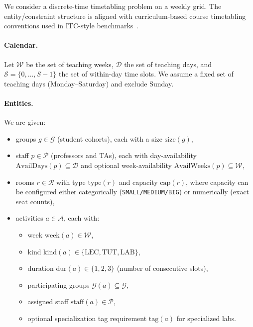 We consider a discrete-time timetabling problem on a weekly grid.
The entity/constraint structure is aligned with curriculum-based course timetabling conventions used in ITC-style benchmarks~\cite{bonutti2012benchmarking,bettinelli2015overview}.

\paragraph{Calendar.}
Let $\mathcal{W}$ be the set of teaching weeks, $\mathcal{D}$ the set of teaching days, and $\mathcal{S}=\{0,\dots,S-1\}$ the set of within-day time slots.
We assume a fixed set of teaching days (Monday--Saturday) and exclude Sunday.

\paragraph{Entities.}
We are given:
\begin{itemize}[leftmargin=*]
  \item groups $g \in \mathcal{G}$ (student cohorts), each with a size $\mathrm{size}(g)$,
  \item staff $p \in \mathcal{P}$ (professors and TAs), each with
    day-availability $\mathrm{AvailDays}(p)\subseteq \mathcal{D}$ and optional
    week-availability $\mathrm{AvailWeeks}(p)\subseteq\mathcal{W}$,
  \item rooms $r \in \mathcal{R}$ with type $\mathrm{type}(r)$ and capacity $\mathrm{cap}(r)$,
    where capacity can be configured either categorically (\texttt{SMALL/MEDIUM/BIG})
    or numerically (exact seat counts),
  \item activities $a \in \mathcal{A}$, each with:
    \begin{itemize}[leftmargin=*]
      \item week $\mathrm{week}(a)\in\mathcal{W}$,
      \item kind $\mathrm{kind}(a)\in\{\mathrm{LEC},\mathrm{TUT},\mathrm{LAB}\}$,
      \item duration $\mathrm{dur}(a)\in\{1,2,3\}$ (number of consecutive slots),
      \item participating groups $\mathcal{G}(a)\subseteq \mathcal{G}$,
      \item assigned staff $\mathrm{staff}(a)\in\mathcal{P}$,
      \item optional specialization tag requirement $\mathrm{tag}(a)$ for specialized labs.
    \end{itemize}
\end{itemize}


